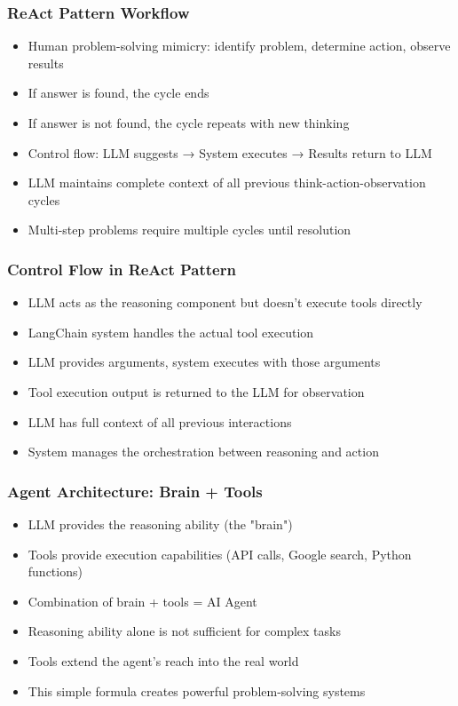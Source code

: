 \begin{frame}[fragile]\frametitle{ReAct Pattern Workflow}
      \begin{itemize}
        \item Human problem-solving mimicry: identify problem, determine action, observe results
        \item If answer is found, the cycle ends
        \item If answer is not found, the cycle repeats with new thinking
        \item Control flow: LLM suggests → System executes → Results return to LLM
        \item LLM maintains complete context of all previous think-action-observation cycles
        \item Multi-step problems require multiple cycles until resolution
      \end{itemize}
\end{frame}

\begin{frame}[fragile]\frametitle{Control Flow in ReAct Pattern}
      \begin{itemize}
        \item LLM acts as the reasoning component but doesn't execute tools directly
        \item LangChain system handles the actual tool execution
        \item LLM provides arguments, system executes with those arguments
        \item Tool execution output is returned to the LLM for observation
        \item LLM has full context of all previous interactions
        \item System manages the orchestration between reasoning and action
      \end{itemize}
\end{frame}

\begin{frame}[fragile]\frametitle{Agent Architecture: Brain + Tools}
      \begin{itemize}
        \item LLM provides the reasoning ability (the "brain")
        \item Tools provide execution capabilities (API calls, Google search, Python functions)
        \item Combination of brain + tools = AI Agent
        \item Reasoning ability alone is not sufficient for complex tasks
        \item Tools extend the agent's reach into the real world
        \item This simple formula creates powerful problem-solving systems
      \end{itemize}
\end{frame}


